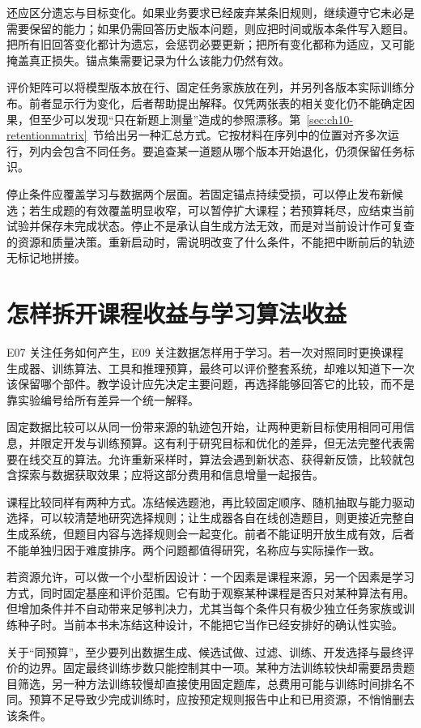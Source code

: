 还应区分遗忘与目标变化。如果业务要求已经废弃某条旧规则，继续遵守它未必是需要保留的能力；如果仍需回答历史版本问题，则应把时间或版本条件写入题目。把所有旧回答变化都计为遗忘，会惩罚必要更新；把所有变化都称为适应，又可能掩盖真正损失。锚点集需要记录为什么该能力仍然有效。

评价矩阵可以将模型版本放在行、固定任务家族放在列，并另列各版本实际训练分布。前者显示行为变化，后者帮助提出解释。仅凭两张表的相关变化仍不能确定因果，但至少可以发现“只在新题上测量”造成的参照漂移。第~\ref{sec:ch10-retentionmatrix}~节给出另一种汇总方式。它按材料在序列中的位置对齐多次运行，列内会包含不同任务。要追查某一道题从哪个版本开始退化，仍须保留任务标识。

停止条件应覆盖学习与数据两个层面。若固定锚点持续受损，可以停止发布新候选；若生成题的有效覆盖明显收窄，可以暂停扩大课程；若预算耗尽，应结束当前试验并保存未完成状态。停止不是承认自生成方法无效，而是对当前设计作可复查的资源和质量决策。重新启动时，需说明改变了什么条件，不能把中断前后的轨迹无标记地拼接。


\section{怎样拆开课程收益与学习算法收益}
\label{sec:ch11-factorial}

E07 关注任务如何产生，E09 关注数据怎样用于学习。若一次对照同时更换课程生成器、训练算法、工具和推理预算，最终可以评价整套系统，却难以知道下一次该保留哪个部件。教学设计应先决定主要问题，再选择能够回答它的比较，而不是靠实验编号给所有差异一个统一解释。

固定数据比较可以从同一份带来源的轨迹包开始，让两种更新目标使用相同可用信息，并限定开发与训练预算。这有利于研究目标和优化的差异，但无法完整代表需要在线交互的算法。允许重新采样时，算法会遇到新状态、获得新反馈，比较就包含探索与数据获取效果；应将这部分费用和信息增量一起报告。

课程比较同样有两种方式。冻结候选题池，再比较固定顺序、随机抽取与能力驱动选择，可以较清楚地研究选择规则；让生成器各自在线创造题目，则更接近完整自生成系统，但题目内容与选择规则会一起变化。前者不能证明开放生成有效，后者不能单独归因于难度排序。两个问题都值得研究，名称应与实际操作一致。

若资源允许，可以做一个小型析因设计：一个因素是课程来源，另一个因素是学习方式，同时固定基座和评价范围。它有助于观察某种课程是否只对某种算法有用。但增加条件并不自动带来足够判决力，尤其当每个条件只有极少独立任务家族或训练种子时。当前本书未冻结这种设计，不能把它当作已经安排好的确认性实验。

关于“同预算”，至少要列出数据生成、候选试做、过滤、训练、开发选择与最终评价的边界。固定最终训练步数只能控制其中一项。某种方法训练较快却需要昂贵题目筛选，另一种方法训练较慢却直接使用固定题库，总费用可能与训练时间排名不同。预算不足导致少完成训练时，应按预定规则报告中止和已用资源，不悄悄删去该条件。


